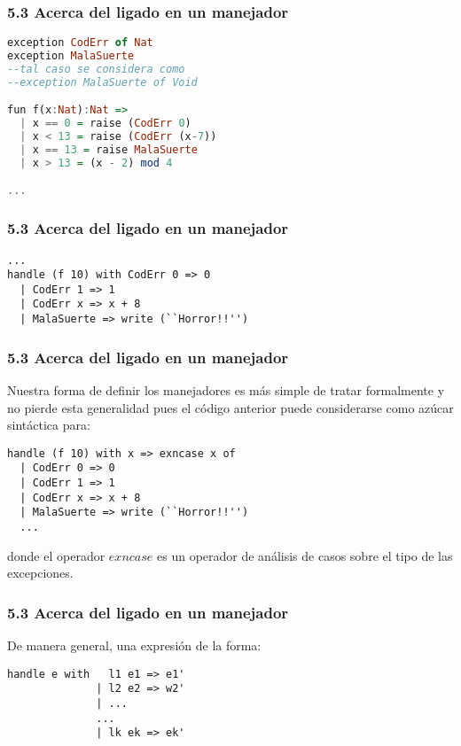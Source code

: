 \documentclass[xcolor=dvipsnames,table,spanish]{beamer}
\begin{document}
\begin{frame}[fragile]
\frametitle{5.3 Acerca del ligado en un manejador}
\begin{example}
\begin{lstlisting}[language=Haskell]
exception CodErr of Nat
exception MalaSuerte
--tal caso se considera como
--exception MalaSuerte of Void

fun f(x:Nat):Nat =>
  | x == 0 = raise (CodErr 0)
  | x < 13 = raise (CodErr (x-7))
  | x == 13 = raise MalaSuerte
  | x > 13 = (x - 2) mod 4

...
\end{lstlisting}
\end{example}
\end{frame}
\begin{frame}[fragile]
\frametitle{5.3 Acerca del ligado en un manejador}
\begin{example}
\begin{lstlisting}
...
handle (f 10) with CodErr 0 => 0
  | CodErr 1 => 1
  | CodErr x => x + 8
  | MalaSuerte => write (``Horror!!'')

\end{lstlisting}
\end{example}
\end{frame}
\begin{frame}[fragile]
\frametitle{5.3 Acerca del ligado en un manejador}
Nuestra forma de definir los manejadores es más simple de tratar formalmente y no pierde esta generalidad pues el código anterior puede considerarse como azúcar sintáctica para:
\begin{example}
\begin{lstlisting}
handle (f 10) with x => exncase x of
  | CodErr 0 => 0
  | CodErr 1 => 1
  | CodErr x => x + 8
  | MalaSuerte => write (``Horror!!'')
  ...
\end{lstlisting}
donde el operador $exncase$ es un operador de análisis de casos sobre el tipo de las excepciones.
\end{example}
\end{frame}
\begin{frame}[fragile]
\frametitle{5.3 Acerca del ligado en un manejador}
De manera general, una expresión de la forma:
\begin{example}
\begin{lstlisting}
handle e with   l1 e1 => e1'
              | l2 e2 => w2'
              | ...
              ...
              | lk ek => ek'
\end{lstlisting}
\end{example}

\end{frame}
\end{document}
